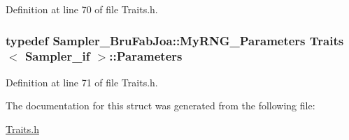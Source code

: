 Definition at line 70 of file Traits.\-h.

\hypertarget{struct_traits_3_01_sampler__if_01_4_a3e3228ca7fdd226d0a78be29ba406660}{
\subsubsection[{Parameters}]{\setlength{\rightskip}{0pt plus 5cm}typedef {\bf Sampler\-\_\-\-Bru\-Fab\-Joa\-::\-My\-R\-N\-G\-\_\-\-Parameters} {\bf Traits}$<$ {\bf Sampler\-\_\-if} $>$\-::{\bf Parameters}}}\label{struct_traits_3_01_sampler__if_01_4_a3e3228ca7fdd226d0a78be29ba406660}


Definition at line 71 of file Traits.\-h.



The documentation for this struct was generated from the following file\-:\begin{DoxyCompactItemize}
\item 
\hyperlink{_traits_8h}{Traits.\-h}\end{DoxyCompactItemize}
